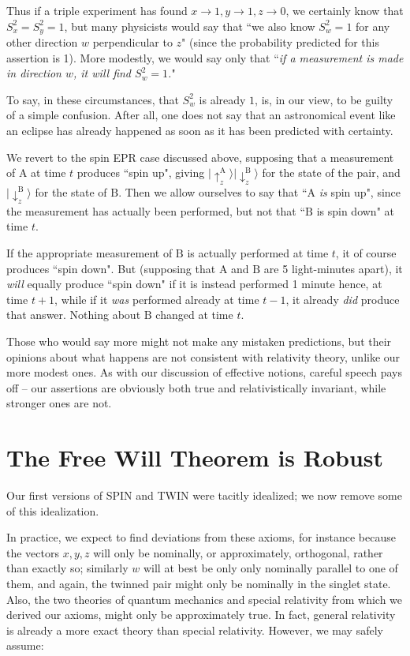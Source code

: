 \documentclass[12pt]{amsart}
\newcommand{\ra}{\mathrm A}
\newcommand{\rb}{\mathrm B}
\newcommand{\uA}{\uparrow}
\newcommand{\dA}{\downarrow}
\begin{document}
Thus if a triple experiment has found  $x \to 1, y \to 1, z \to 0$, 
we certainly know that $S_x^2 = S_y^2 = 1$, but many physicists would 
say that ``we also know $S_w^2 = 1$ for any other direction $w$ 
perpendicular to $z$" (since the probability predicted for this 
assertion is 1).  More modestly, we would say only that ``{\em if 
a measurement is made in direction $w$, it will find $S_w^2 = 1$.}"

To say, in these circumstances, that $S_w^2$ is already $1$, is, in our view,
to be guilty of a simple confusion.  After all, one does not say that 
an astronomical event like an eclipse has already happened as soon as 
it has been predicted with certainty.
   
We revert to the spin EPR case discussed above, supposing that 
a measurement of $\ra$ at time $t$ produces ``spin up", 
giving  $|\uA^\ra_z \rangle |\dA^\rb_z \rangle$ for the state of
the pair, and $|\dA^\rb_z \rangle$ for the state of $\rb$. 
Then we allow ourselves to say that
``$\ra$ {\em is} spin up", since the measurement has actually 
been performed, but not that
``$\rb$ is spin down" at time $t$.  

If the appropriate measurement of $\rb$ is actually performed at time $t$, it
of course produces ``spin down".  But (supposing that $\ra$ and $\rb$ are 
5 light-minutes apart), it {\em will} equally produce ``spin down" 
if it is instead performed 1 minute hence, at time $t + 1$, while if it 
{\em was} performed already at time $t - 1$, it already {\em did}
 produce that answer.  Nothing about $\rb$ changed at time $t$.

Those who would say more might not make any mistaken predictions, but their 
opinions about what happens are not consistent with relativity theory, 
unlike our more modest ones.  As with our discussion of effective notions,
careful speech pays off -- our assertions are obviously both true and
relativistically invariant, while stronger ones are not. 

\section{The Free Will Theorem is Robust}

Our first versions of SPIN and TWIN were tacitly idealized; we now remove some of
this idealization.

In practice, we expect to find deviations from these axioms, 
for instance because the vectors
$x,y,z$ will only be nominally, or approximately, orthogonal, 
rather than exactly so; similarly $w$ will
at best be only only nominally parallel to one of them, 
and again, the twinned pair
might only be nominally in the singlet state. Also, the two theories of
quantum mechanics and special relativity from which we 
derived our axioms, might only be
approximately true. In fact, general relativity is already a more exact theory than special 
relativity. However, we may safely assume:
\end{document}
